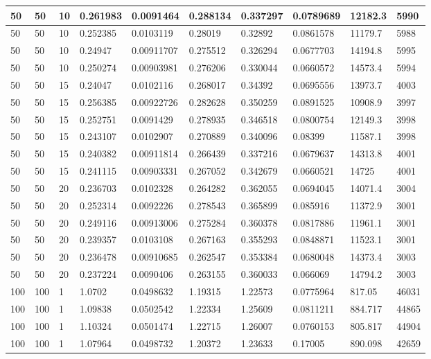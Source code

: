 \begin{landscape}
\begin{longtable}{ | l | l | l | l | l | l | l | l | l | l | }
50 & 50 & 10 & 0.261983 & 0.0091464 & 0.288134 & 0.337297 & 0.0789689 & 12182.3 & 5990\\ \hline
50 & 50 & 10 & 0.252385 & 0.0103119 & 0.28019 & 0.32892 & 0.0861578 & 11179.7 & 5988\\ \hline
50 & 50 & 10 & 0.24947 & 0.00911707 & 0.275512 & 0.326294 & 0.0677703 & 14194.8 & 5995\\ \hline
50 & 50 & 10 & 0.250274 & 0.00903981 & 0.276206 & 0.330044 & 0.0660572 & 14573.4 & 5994\\ \hline
50 & 50 & 15 & 0.24047 & 0.0102116 & 0.268017 & 0.34392 & 0.0695556 & 13973.7 & 4003\\ \hline
50 & 50 & 15 & 0.256385 & 0.00922726 & 0.282628 & 0.350259 & 0.0891525 & 10908.9 & 3997\\ \hline
50 & 50 & 15 & 0.252751 & 0.0091429 & 0.278935 & 0.346518 & 0.0800754 & 12149.3 & 3998\\ \hline
50 & 50 & 15 & 0.243107 & 0.0102907 & 0.270889 & 0.340096 & 0.08399 & 11587.1 & 3998\\ \hline
50 & 50 & 15 & 0.240382 & 0.00911814 & 0.266439 & 0.337216 & 0.0679637 & 14313.8 & 4001\\ \hline
50 & 50 & 15 & 0.241115 & 0.00903331 & 0.267052 & 0.342679 & 0.0660521 & 14725 & 4001\\ \hline
50 & 50 & 20 & 0.236703 & 0.0102328 & 0.264282 & 0.362055 & 0.0694045 & 14071.4 & 3004\\ \hline
50 & 50 & 20 & 0.252314 & 0.0092226 & 0.278543 & 0.365899 & 0.085916 & 11372.9 & 3001\\ \hline
50 & 50 & 20 & 0.249116 & 0.00913006 & 0.275284 & 0.360378 & 0.0817886 & 11961.1 & 3001\\ \hline
50 & 50 & 20 & 0.239357 & 0.0103108 & 0.267163 & 0.355293 & 0.0848871 & 11523.1 & 3001\\ \hline
50 & 50 & 20 & 0.236478 & 0.00910685 & 0.262547 & 0.353384 & 0.0680048 & 14373.4 & 3003\\ \hline
50 & 50 & 20 & 0.237224 & 0.0090406 & 0.263155 & 0.360033 & 0.066069 & 14794.2 & 3003\\ \hline
100 & 100 & 1 & 1.0702 & 0.0498632 & 1.19315 & 1.22573 & 0.0775964 & 817.05 & 46031\\ \hline
100 & 100 & 1 & 1.09838 & 0.0502542 & 1.22334 & 1.25609 & 0.0811211 & 884.717 & 44865\\ \hline
100 & 100 & 1 & 1.10324 & 0.0501474 & 1.22715 & 1.26007 & 0.0760153 & 805.817 & 44904\\ \hline
100 & 100 & 1 & 1.07964 & 0.0498732 & 1.20372 & 1.23633 & 0.17005 & 890.098 & 42659\\ \hline

\end{longtable}
\end{landscape}
